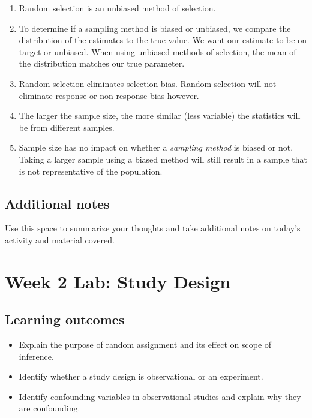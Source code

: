 \documentclass[
]{report}
\begin{document}
\begin{enumerate}
\def\labelenumi{\arabic{enumi}.}
\item
  Random selection is an unbiased method of selection.
\item
  To determine if a sampling method is biased or unbiased, we compare the distribution of the estimates to the true value. We want our estimate to be on target or unbiased. When using unbiased methods of selection, the mean of the distribution matches our true parameter.
\item
  Random selection eliminates selection bias. Random selection will not eliminate response or non-response bias however.
\item
  The larger the sample size, the more similar (less variable) the statistics will be from different samples.
\item
  Sample size has no impact on whether a \emph{sampling method} is biased or not. Taking a larger sample using a biased method will still result in a sample that is not representative of the population.
\end{enumerate}

\hypertarget{additional-notes-2}{%
\subsection{Additional notes}\label{additional-notes-2}}

Use this space to summarize your thoughts and take additional notes on today's activity and material covered.

\newpage

\hypertarget{week-2-lab-study-design}{%
\section{Week 2 Lab: Study Design}\label{week-2-lab-study-design}}


\hypertarget{learning-outcomes-3}{%
\subsection{Learning outcomes}\label{learning-outcomes-3}}

\begin{itemize}
\item
  Explain the purpose of random assignment and its effect on scope of inference.
\item
  Identify whether a study design is observational or an experiment.
\item
  Identify confounding variables in observational studies and explain why they are confounding.
\end{itemize}
\end{document}
